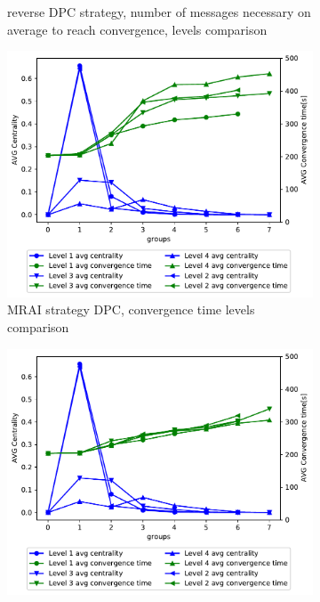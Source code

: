 \begin{figure}[h]
\begin{subfigure}[b]{0.49\textwidth}
		 \caption{reverse \ac{DPC} strategy, number of messages necessary on
			average to reach convergence, levels comparison}
         \label{fig:different_levels_comparison_reverse_dpc_msg}
     \end{subfigure}
     \begin{subfigure}[b]{0.49\textwidth}
         \centering
         \includegraphics[width=\textwidth]{images/hierarchy/dpc_all_levels_comparison_centVStime.pdf}
		 \caption{\ac{MRAI} strategy \ac{DPC}, convergence time levels comparison}
         \label{fig:different_levels_comparison_dpc_time}
     \end{subfigure}
	 \hfill
     \begin{subfigure}[b]{0.49\textwidth}
         \centering
         \includegraphics[width=\textwidth]{images/hierarchy/reverse_dpc_all_levels_comparison_centVStime.pdf}

\end{subfigure}
\end{figure}
